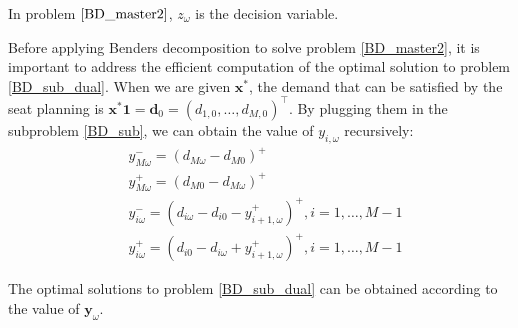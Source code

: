 



In problem $\eqref{BD_master2}$, $z_{\omega}$ is the decision variable.

Before applying Benders decomposition to solve problem \eqref{BD_master2}, it is important to address the efficient computation of the optimal solution to problem \eqref{BD_sub_dual}.
When we are given $\mathbf{x}^{*}$, the demand that can be satisfied by the seat planning is $\mathbf{x}^{*} \mathbf{1} = \mathbf{d}_0 = (d_{1,0},\ldots,d_{M,0})^{\intercal}$.
By plugging them in the subproblem \eqref{BD_sub}, we can obtain the value of $y_{i, \omega}$ recursively:
\begin{equation}\label{y_recursively}
\begin{aligned}
  & y_{M \omega}^{-}=\left(d_{M \omega}-d_{M 0}\right)^{+} \\
  & y_{M \omega}^{+}=\left(d_{M 0}-d_{M \omega}\right)^{+} \\
  & y_{i \omega}^{-}=\left(d_{i \omega}-d_{i 0} - y_{i+1, \omega}^{+} \right)^{+}, i =1,\ldots, M-1 \\
  & y_{i \omega}^{+}=\left(d_{i 0}- d_{i \omega} + y_{i+1, \omega}^{+}\right)^{+}, i =1,\ldots, M-1
\end{aligned}
\end{equation}

The optimal solutions to problem \eqref{BD_sub_dual} can be obtained according to the value of $\mathbf{y}_{\omega}$.

